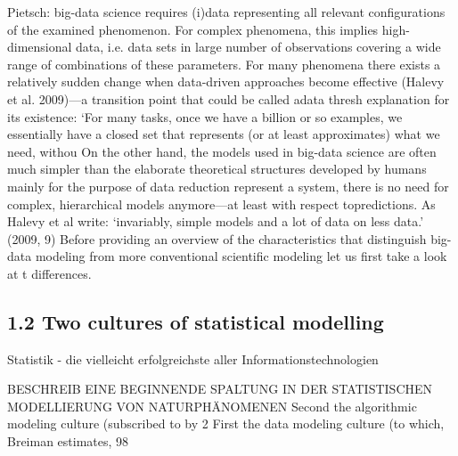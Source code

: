 \documentclass[authoryear,review,3p]{elsarticle}
\begin{document}
Pietsch:
big-data science requires (i)data representing all relevant configurations of the examined phenomenon. For complex phenomena, this implies high-dimensional data, i.e. data sets in large number of observations covering a wide range of combinations of these parameters.
For many phenomena there exists a relatively sudden change when data-driven approaches become effective (Halevy et al. 2009)—a transition point that could be called adata thresh explanation for its existence: ‘For many tasks, once we have a billion or so examples, we essentially have a closed set that represents (or at least approximates) what we need, withou
On the other hand, the models used in big-data science are often much simpler than the elaborate theoretical structures developed by humans mainly for the purpose of data reduction represent a system, there is no need for complex, hierarchical models anymore—at least with respect topredictions. As Halevy et al write: ‘invariably, simple models and a lot of data on less data.’ (2009, 9) Before providing an overview of the characteristics that distinguish big-data modeling from more conventional scientific modeling let us first take a look at t differences.





\subsection*{1.2 Two cultures of statistical modelling}

Statistik - die vielleicht erfolgreichste aller Informationstechnologien




BESCHREIB EINE BEGINNENDE SPALTUNG IN DER STATISTISCHEN MODELLIERUNG VON NATURPHÄNOMENEN
Second the algorithmic modeling culture (subscribed to by 2%
First the data modeling culture (to which, Breiman estimates, 98%
\end{document}
